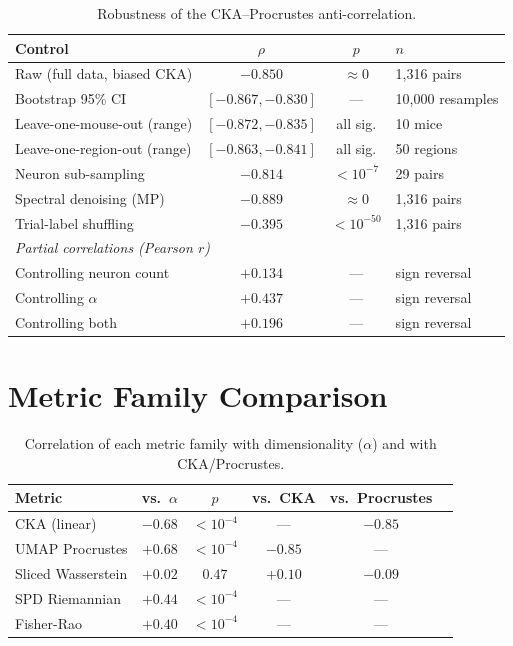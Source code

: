 \documentclass{article}
\begin{document}
\begin{table}[h]
\centering
\small
\caption{Robustness of the CKA--Procrustes anti-correlation.}
\label{tab:robustness}
\begin{tabular}{@{}lccl@{}}
\toprule
\textbf{Control} & \textbf{$\rho$} & \textbf{$p$} & \textbf{$n$} \\
\midrule
Raw (full data, biased CKA) & $-0.850$ & $\approx 0$ & 1,316 pairs \\
Bootstrap 95\% CI & $[-0.867, -0.830]$ & --- & 10,000 resamples \\
Leave-one-mouse-out (range) & $[-0.872, -0.835]$ & all sig. & 10 mice \\
Leave-one-region-out (range) & $[-0.863, -0.841]$ & all sig. & 50 regions \\
Neuron sub-sampling & $-0.814$ & $< 10^{-7}$ & 29 pairs \\
Spectral denoising (MP) & $-0.889$ & $\approx 0$ & 1,316 pairs \\
Trial-label shuffling & $-0.395$ & $< 10^{-50}$ & 1,316 pairs \\
\midrule
\multicolumn{4}{l}{\emph{Partial correlations (Pearson $r$)}} \\
Controlling neuron count & $+0.134$ & --- & sign reversal \\
Controlling $\alpha$ & $+0.437$ & --- & sign reversal \\
Controlling both & $+0.196$ & --- & sign reversal \\
\bottomrule
\end{tabular}
\end{table}


\section{Metric Family Comparison}
\label{app:metrics}

\begin{table}[h]
\centering
\small
\caption{Correlation of each metric family with dimensionality ($\alpha$) and with CKA/Procrustes.}
\label{tab:metrics}
\begin{tabular}{@{}lccccc@{}}
\toprule
\textbf{Metric} & \textbf{vs.\ $\alpha$} & \textbf{$p$} & \textbf{vs.\ CKA} & \textbf{vs.\ Procrustes} \\
\midrule
CKA (linear) & $-0.68$ & $< 10^{-4}$ & --- & $-0.85$ \\
UMAP Procrustes & $+0.68$ & $< 10^{-4}$ & $-0.85$ & --- \\
Sliced Wasserstein & $+0.02$ & $0.47$ & $+0.10$ & $-0.09$ \\
SPD Riemannian & $+0.44$ & $< 10^{-4}$ & --- & --- \\
Fisher-Rao & $+0.40$ & $< 10^{-4}$ & --- & --- \\
\bottomrule
\end{tabular}
\end{table}
\end{document}
